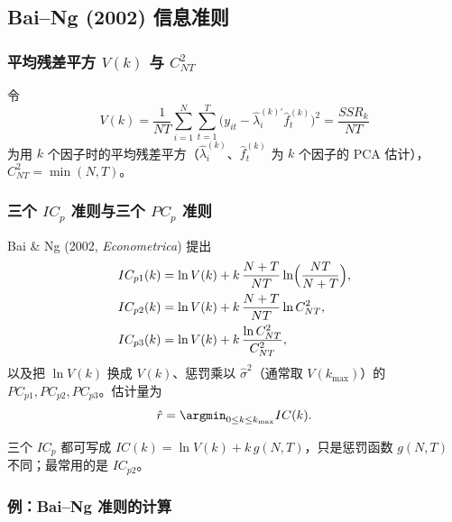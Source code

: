 \subsection{Bai--Ng (2002) 信息准则 \tagext}

\subsubsection{平均残差平方 \texorpdfstring{$V(k)$}{V(k)} 与 \texorpdfstring{$C_{NT}^2$}{C\_NT\^{}2}}

令
\[
V(k)=\frac1{NT}\sum_{i=1}^N\sum_{t=1}^T\bigl(y_{it}-\hat\lambda_i^{(k)\prime}\hat f_t^{(k)}\bigr)^2=\frac{SSR_k}{NT}
\]
为用 $k$ 个因子时的平均残差平方（$\hat\lambda_i^{(k)}$、$\hat f_t^{(k)}$ 为 $k$ 个因子的 PCA 估计），$C_{NT}^2=\min(N,T)$。

\subsubsection{三个 \texorpdfstring{$IC_p$}{IC\_p} 准则与三个 \texorpdfstring{$PC_p$}{PC\_p} 准则}

\begin{defn}\label{def:U13b-baing}
Bai \& Ng (2002, \emph{Econometrica}) 提出
\begin{align*}
IC_{p1}(k)&=\ln V(k)+k\,\frac{N+T}{NT}\ln\Bigl(\frac{NT}{N+T}\Bigr),\\
IC_{p2}(k)&=\ln V(k)+k\,\frac{N+T}{NT}\ln C_{NT}^2,\\
IC_{p3}(k)&=\ln V(k)+k\,\frac{\ln C_{NT}^2}{C_{NT}^2},
\end{align*}
以及把 $\ln V(k)$ 换成 $V(k)$、惩罚乘以 $\hat\sigma^2$（通常取 $V(k_{\max})$）的 $PC_{p1},PC_{p2},PC_{p3}$。估计量为
\[
\hat r=\argmin_{0\le k\le k_{\max}}IC(k).
\]
\end{defn}

三个 $IC_p$ 都可写成 $IC(k)=\ln V(k)+k\,g(N,T)$，只是惩罚函数 $g(N,T)$ 不同；最常用的是 $IC_{p2}$。

\subsubsection{例：Bai--Ng 准则的计算}

